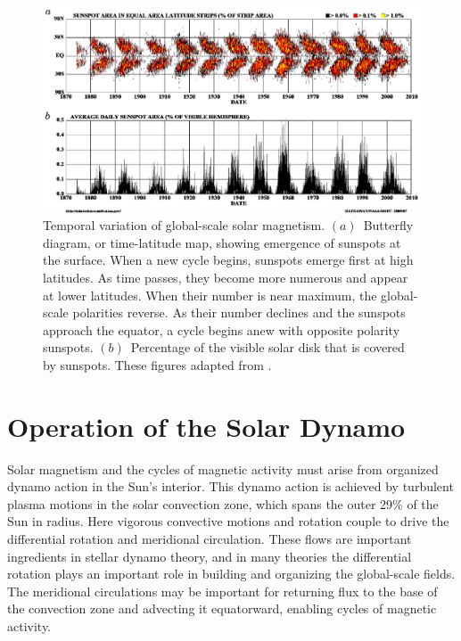 \begin{figure}[!t]
  \begin{center}
    \includegraphics[width=\linewidth]{figs/chapter_1/Hathaway_butterfly_diagram_073009.eps}
  \end{center}
  \caption[Temporal variation of global-scale solar magnetism]
          {Temporal variation of global-scale solar magnetism.
            $(a)$~Butterfly diagram, or time-latitude map, showing
            emergence of sunspots at the surface.  When a new cycle
            begins, sunspots emerge first at high latitudes.  As time
            passes, they become more numerous and appear at lower
            latitudes.  When their number is near maximum, the global-scale
            polarities reverse.  As their number declines and the
            sunspots approach the equator, a cycle begins anew with
            opposite polarity sunspots.
            $(b)$~Percentage of the visible solar disk that is
            covered by sunspots.  These figures adapted from
            \cite{Hathaway_2009}. 
            \label{fig:butterfly diagram}}
          \vskip-0.5cm
\end{figure}



\section{Operation of the Solar Dynamo}
Solar magnetism and the cycles of magnetic activity must arise from
organized dynamo action in the Sun's interior.  This dynamo
action is achieved by turbulent plasma motions
in the solar convection zone, which spans the outer 29\%
of the Sun in radius.  Here vigorous convective motions and rotation
couple to drive the differential rotation and
meridional circulation.  These flows are important ingredients in
stellar dynamo theory, and in many theories the differential rotation
plays an  important role in building and organizing the global-scale
fields. The meridional circulations may be important for returning flux
to the base of the convection zone and advecting it equatorward,
enabling cycles of magnetic activity.  

